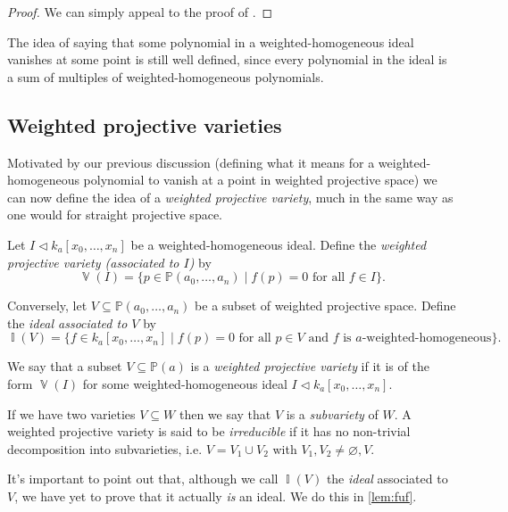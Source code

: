 \documentclass[10pt,notitlepage]{article}
\numberwithin{equation}{subsection}
\DeclareMathOperator{\van}{\mathbb{V}}
\DeclareMathOperator{\ide}{\mathbb{I}}
\newcommand{\pee}{\mathbb{P}}
\newcommand{\kazn}{k_a[x_0,\ldots,x_n]}
\newcommand{\pazn}{\pee(a_0,\ldots,a_n)}
\begin{document}
\begin{proof}
    We can simply appeal to the proof of \cite[Chapter~6,~Section~1,~Lemma~1.2]{Agrawal:uf}.
\end{proof}

The idea of saying that some polynomial in a weighted-homogeneous ideal vanishes at some point is still well defined, since every polynomial in the ideal is a sum of multiples of weighted-homogeneous polynomials.



    \subsection{Weighted projective varieties} %
    \label{sub:weighted_projective_varieties}
    
    Motivated by our previous discussion (defining what it means for a weighted-homogeneous polynomial to vanish at a point in weighted projective space) we can now define the idea of a \emph{weighted projective variety}, much in the same way as one would for straight projective space.

    \begin{definition}\label{defn:v-and-i}
        Let $I\triangleleft \kazn$ be a weighted-homogeneous ideal.
        Define the \emph{weighted projective variety (associated to $I$)} by
        \[\van(I) = \{p\in\pazn \mid f(p)=0\text{ for all }f\in I\}.\]

        Conversely, let $V\subseteq\pazn$ be a subset of weighted projective space.
        Define the \emph{ideal associated to $V$} by
        \[\ide(V) = \{f\in \kazn \mid f(p)=0\text{ for all }p\in V\text{ and }f\text{ is }a\text{-weighted-homogeneous}\}.\]

        We say that a subset $V\subseteq\pee(a)$ is a \emph{weighted projective variety} if it is of the form $\van(I)$ for some weighted-homogeneous ideal $I\triangleleft \kazn$.
        
        If we have two varieties $V\subseteq W$ then we say that $V$ is a \emph{subvariety} of $W$.
        A weighted projective variety is said to be \emph{irreducible} if it has no non-trivial decomposition into subvarieties, i.e. $V=V_1\cup V_2$ with $V_1,V_2\neq\varnothing,V$.
    \end{definition}

    It's important to point out that, although we call $\ide(V)$ the \emph{ideal} associated to $V$, we have yet to prove that it actually \emph{is} an ideal.
    We do this in \cref{lem:fuf}.
\end{document}
